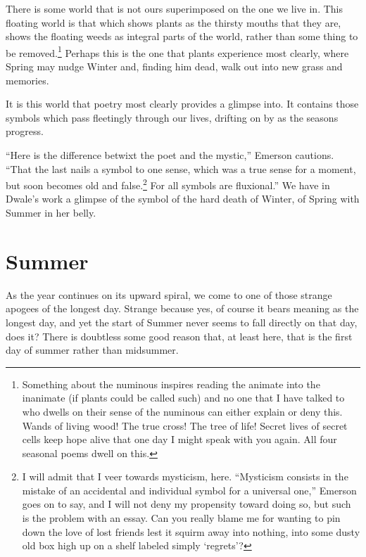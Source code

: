 \documentclass[12pt]{memoir}
\begin{document}
There is some world that is not ours superimposed on the one we live in. This floating world is that which shows plants as the thirsty mouths that they are, shows the floating weeds as integral parts of the world, rather than some thing to be removed.\footnote{Something about the numinous inspires reading the animate into the inanimate (if plants could be called such) and no one that I have talked to who dwells on their sense of the numinous can either explain or deny this. Wands of living wood! The true cross! The tree of life! Secret lives of secret cells keep hope alive that one day I might speak with you again. All four seasonal poems dwell on this.} Perhaps this is the one that plants experience most clearly, where Spring may nudge Winter and, finding him dead, walk out into new grass and memories.

It is this world that poetry most clearly provides a glimpse into. It contains those symbols which pass fleetingly through our lives, drifting on by as the seasons progress.

``Here is the difference betwixt the poet and the mystic,'' Emerson cautions. ``That the last nails a symbol to one sense, which was a true sense for a moment, but soon becomes old and false.\footnote{I will admit that I veer towards mysticism, here. ``Mysticism consists in the mistake of an accidental and individual symbol for a universal one,'' Emerson goes on to say, and I will not deny my propensity toward doing so, but such is the problem with an essay. Can you really blame me for wanting to pin down the love of lost friends lest it squirm away into nothing, into some dusty old box high up on a shelf labeled simply `regrets'?} For all symbols are fluxional.'' \parencite[33]{emerson} We have in Dwale's work a glimpse of the symbol of the hard death of Winter, of Spring with Summer in her belly.


\clearpage

\section*{Summer}

As the year continues on its upward spiral, we come to one of those strange apogees of the longest day. Strange because yes, of course it bears meaning as the longest day, and yet the start of Summer never seems to fall directly on that day, does it? There is doubtless some good reason that, at least here, that is the first day of summer rather than midsummer.
\end{document}

